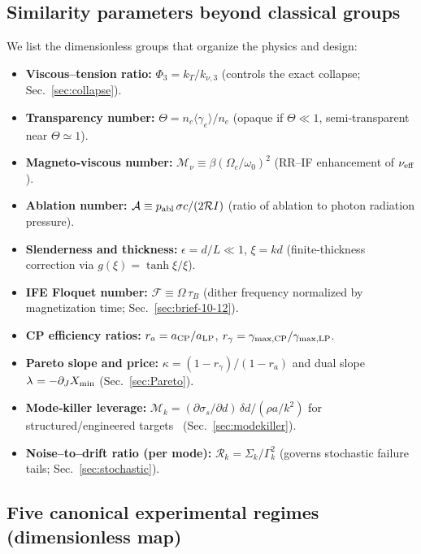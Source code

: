 \documentclass[aps,pre,twocolumn,showpacs,superscriptaddress]{revtex4-2}
\theoremstyle{definition}
\begin{document}
\subsection{Similarity parameters beyond classical groups}

We list the dimensionless groups that organize the physics and design:

\begin{itemize}[leftmargin=1.4em,itemsep=2pt]
\item \textbf{Viscous–tension ratio:} $\Phi_3=k_T/k_{\nu,3}$ (controls the exact collapse; Sec.~\ref{sec:collapse}).
\item \textbf{Transparency number:} $\Theta=n_c\langle\gamma_e\rangle/n_e$ (opaque if $\Theta\ll1$, semi‑transparent near $\Theta\simeq1$).
\item \textbf{Magneto‑viscous number:} $\mathcal{M}_\nu\equiv \beta(\Omega_c/\omega_0)^2$ (RR–IF enhancement of $\nu_{\rm eff}$).
\item \textbf{Ablation number:} $\mathcal{A}\equiv p_{\rm abl}\,\sigma c/(2\mathcal{R}I)$ (ratio of ablation to photon radiation pressure).
\item \textbf{Slenderness and thickness:} $\epsilon=d/L\ll1$, $\xi=kd$ (finite‑thickness correction via $g(\xi)=\tanh\xi/\xi$).
\item \textbf{IFE Floquet number:} $\mathcal{F}\equiv \Omega\,\tau_B$ (dither frequency normalized by magnetization time; Sec.~\ref{sec:brief-10-12}).
\item \textbf{CP efficiency ratios:} $r_a=a_{\rm CP}/a_{\rm LP}$, $r_\gamma=\gamma_{\max,{\rm CP}}/\gamma_{\max,{\rm LP}}$.
\item \textbf{Pareto slope and price:} $\kappa=(1-r_\gamma)/(1-r_a)$ and dual slope $\lambda^{\*}=-\partial_J X_{\min}$ (Sec.~\ref{sec:Pareto}).
\item \textbf{Mode‑killer leverage:} $\mathcal{M}_k=(\partial\sigma_s/\partial d)\,\delta d/(\rho a/k^2)$ for structured/engineered targets~\cite{Prencipe2016PPCF,Passoni2016PRAB,Bin2018PRL} (Sec.~\ref{sec:modekiller}).
\item \textbf{Noise–to–drift ratio (per mode):} $\mathcal{R}_k=\Sigma_k/\Gamma_k^2$ (governs stochastic failure tails; Sec.~\ref{sec:stochastic}).
\end{itemize}

\subsection{Five canonical experimental regimes (dimensionless map)}
\end{document}
